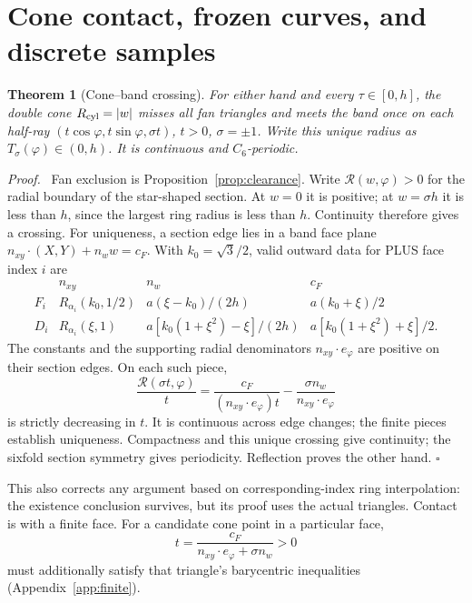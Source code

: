 \documentclass[11pt,a4paper]{article}
\numberwithin{equation}{section}
\newtheorem{theorem}{Theorem}[section]
\newenvironment{proof}[1][Proof]{\par\noindent\textit{#1.}\ \ignorespaces}
{\unskip\nobreak\hfill$\square$\par}
\begin{document}
\section{Cone contact, frozen curves, and discrete samples}\label{sec:macro}
\begin{theorem}[Cone--band crossing]\label{thm:cone}
For either hand and every $\tau\in[0,h]$, the double cone
$R_{\rm cyl}=|w|$ misses all fan triangles and meets the band once on
each half-ray $(t\cos\varphi,t\sin\varphi,\sigma t)$,
$t>0$, $\sigma=\pm1$. Write this unique radius as
$T_\sigma(\varphi)\in(0,h)$. It is continuous and $C_6$-periodic.
\end{theorem}
\begin{proof}
Fan exclusion is Proposition~\ref{prop:clearance}. Write
$\mathcal R(w,\varphi)>0$ for the radial boundary of the star-shaped section.
At $w=0$ it is positive; at $w=\sigma h$ it is less than $h$, since the
largest ring radius is less than $h$. Continuity therefore gives a crossing.
For uniqueness, a section edge lies in a band face plane
$n_{xy}\cdot(X,Y)+n_ww=c_F$. With $k_0=\sqrt3/2$, valid outward data for
PLUS face index $i$ are
\begin{equation}\label{eq:bandplanes}
\begin{array}{c|ccc}
&n_{xy}&n_w&c_F\\ \hline
F_i&R_{\alpha_i}(k_0,1/2)&a(\xi-k_0)/(2h)&a(k_0+\xi)/2\\
D_i&R_{\alpha_i}(\xi,1)&a[k_0(1+\xi^2)-\xi]/(2h)&
a[k_0(1+\xi^2)+\xi]/2 .
\end{array}
\end{equation}
The constants and the supporting radial denominators
$n_{xy}\cdot e_\varphi$ are positive on their section edges. On each such
piece,
\[
\frac{\mathcal R(\sigma t,\varphi)}t
=\frac{c_F}{(n_{xy}\cdot e_\varphi)t}
-\frac{\sigma n_w}{n_{xy}\cdot e_\varphi}
\]
is strictly decreasing in $t$. It is continuous across edge changes;
the finite pieces establish uniqueness. Compactness and this unique crossing
give continuity; the sixfold section symmetry gives periodicity.
Reflection proves the other hand.
\end{proof}

This also corrects any argument based on corresponding-index ring
interpolation: the existence conclusion survives, but its proof uses the
actual triangles. Contact is with a finite face. For a candidate cone point
in a particular face,
\[
t=\frac{c_F}{n_{xy}\cdot e_\varphi+\sigma n_w}>0
\]
must additionally satisfy that triangle's barycentric inequalities
(Appendix~\ref{app:finite}).
\end{document}
